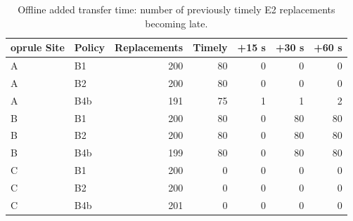\begin{table}[H]\centering\footnotesize
\caption{Offline added transfer time: number of previously timely E2 replacements becoming late.}\label{tab:transfer}
\begin{tabularx}{\textwidth}{@{}llrrrrr@{}}	oprule
Site & Policy & Replacements & Timely & +15 s & +30 s & +60 s \\\midrule
A & B1 & 200 & 80 & 0 & 0 & 0 \\
A & B2 & 200 & 80 & 0 & 0 & 0 \\
A & B4b & 191 & 75 & 1 & 1 & 2 \\
B & B1 & 200 & 80 & 0 & 80 & 80 \\
B & B2 & 200 & 80 & 0 & 80 & 80 \\
B & B4b & 199 & 80 & 0 & 80 & 80 \\
C & B1 & 200 & 0 & 0 & 0 & 0 \\
C & B2 & 200 & 0 & 0 & 0 & 0 \\
C & B4b & 201 & 0 & 0 & 0 & 0 \\
\bottomrule\end{tabularx}\end{table}
